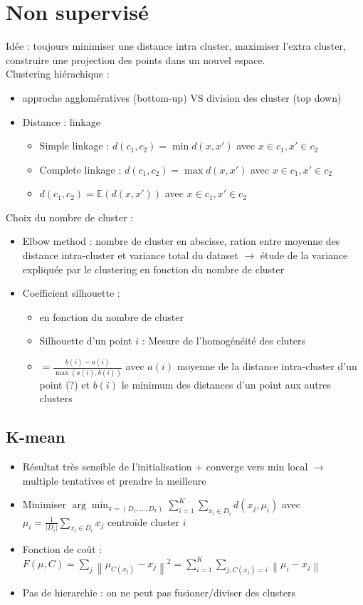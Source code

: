 \documentclass{article}
\theoremstyle{plain}%
\theoremstyle{definition}
\theoremstyle{remark}
\begin{document}
\section{Non supervisé}
Idée : toujours minimiser une distance intra cluster, maximiser l'extra cluster, construire une projection des points dans un nouvel espace. \\
Clustering hiérachique : 
\begin{itemize}
    \item approche agglomératives (bottom-up) VS division des cluster (top down)
    \item Distance : linkage \begin{itemize}
        \item Simple linkage : $ d(c_1, c_2) = \min d(x, x') $ avec $ x \in c_1, x' \in c_2 $ 
        \item Complete linkage : $ d(c_1, c_2) = \max d(x, x') $ avec $ x \in c_1, x' \in c_2 $ 
        \item $ d(c_1, c_2) = \mathbb{E}(d(x, x')) $ avec $ x \in c_1, x' \in c_2 $ 
    \end{itemize}
\end{itemize}
Choix du nombre de cluster : 
\begin{itemize}
    \item Elbow method : nombre de cluster en abscisse, ration entre moyenne des distance intra-cluster et variance total du dataset $\rightarrow$ étude de la variance expliquée par le clustering en fonction du nombre de cluster 
    \item Coefficient silhouette : \begin{itemize}
        \item en fonction du nombre de cluster
        \item Silhouette d'un point $ i $ : Mesure de l'homogénéité des cluters
        \item $ = \frac{b(i) - a(i)}{ \max (a(i), b(i))} $ avec $ a(i) $ moyenne de la distance intra-cluster d'un point (?) et $ b(i) $ le minimum des distances d'un point aux autres clusters
    \end{itemize}
\end{itemize}

\subsection{K-mean}
\begin{itemize}
    \item Résultat très sensible de l'initialisation + converge vers min local $\rightarrow$ multiple tentatives et prendre la meilleure
    \item Minimiser $ \arg \min _{\pi = (D_1, \dots, D_k)} \sum_{i=1}^{K} \sum_{x_i \in D_i}^{} d(x_j, \mu _i)$ avec $ \mu _i = \frac{1}{\left| D_i \right| } \sum_{x_i \in D_i} x_j$ centroïde cluster $ i $ 
    \item Fonction de coût : $ F(\mu , C) = \sum_{j}^{} \left\| \mu _{C(x_j)} - x_j \right\|^2 = \sum_{i=1}^{K} \sum_{j, C(x_j) = i} \left\| \mu _i - x_j \right\| $ 
    \item Pas de hierarchie : on ne peut pas fusioner/diviser des clusters
\end{itemize}
\end{document}
